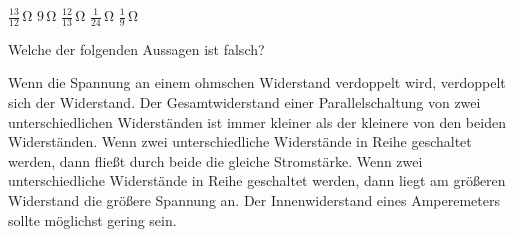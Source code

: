 \documentclass[11pt]{exam}
\begin{document}
\begin{questions}
\begin{choices}
	\choice \(\mathrm{\frac{13}{12}\,\Omega}\)
	\choice \(\mathrm{9\,\Omega}\)
	\choice \(\mathrm{\frac{12}{13}\,\Omega}\)
	\choice \(\mathrm{\frac{1}{24}\,\Omega}\)
	\choice \(\mathrm{\frac{1}{9}\,\Omega}\)
\end{choices}

\vspace{3mm}\question Welche der folgenden Aussagen ist falsch?

\begin{choices}
	\choice Wenn die Spannung an einem ohmschen Widerstand verdoppelt wird, verdoppelt sich der Widerstand.
	\choice Der Gesamtwiderstand einer Parallelschaltung von zwei unterschiedlichen Widerständen ist immer kleiner als der kleinere von den beiden Widerständen.
	\choice Wenn zwei unterschiedliche Widerstände in Reihe geschaltet werden, dann fließt durch beide die gleiche Stromstärke.
	\choice Wenn zwei unterschiedliche Widerstände in Reihe geschaltet werden, dann liegt am größeren Widerstand die größere Spannung an.
	\choice Der Innenwiderstand eines Amperemeters sollte möglichst gering sein.
\end{choices}

\vspace{3mm}\end{questions}
\end{document}
